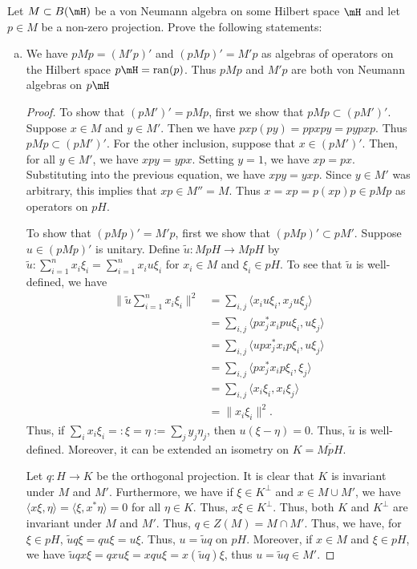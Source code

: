 \documentclass{article}
\begin{document}
 Let $M \subset B(\mH)$ be a von Neumann algebra on some Hilbert space $\mH$ and let $p \in M$ be a non-zero projection.  Prove the following statements:
\begin{enumerate}[(a)]
\item We have $pMp = (M' p)'$ and $(pMp)' = M'p$ as algebras of operators on the Hilbert space $p \mH = \ran(p)$.  Thus $pMp$ and $M'p$ are both von Neumann algebras on $p \mH$
  \begin{proof}
  To show that $(pM')' = pMp$, first we show that $pMp \subset (pM')'$. Suppose $x \in M$ and $y \in M'$.  Then we have $pxp(py) = ppxpy = pypxp$.  Thus $pMp \subset (pM')'$.  For the other inclusion, suppose that $x \in (pM')'$.  Then, for all $y \in M'$, we have $xpy = ypx$.  Setting $y = 1$, we have $xp = px$.  Substituting into the previous equation, we have $xpy = yxp$.  Since $y \in M'$ was arbitrary, this implies that $xp \in M'' = M$.  Thus $x = xp = p(xp)p \in pMp$ as operators on $pH$.

  To show that $(pMp)' = M'p$, first we show that $(pMp)' \subset pM'$.  Suppose $u \in (pMp)'$ is unitary. Define $\widetilde u : MpH \to MpH$ by
  $\widetilde u: \sum_{i=1}^n x_i \xi_i = \sum_{i=1}^n x_i u \xi_i$ for $x_i \in M$ and $\xi_i \in pH$.  To see that $\widetilde u$ is well-defined,
  we have
  \begin{align*}
    \| \widetilde u \sum_{i=1}^n x_i \xi_i \|^2 & = \sum_{i,j} \langle x_i u \xi_i, x_j u \xi_j \rangle \\
    & = \sum_{i,j} \langle p x_j^* x_i p u \xi_i,  u \xi_j \rangle \\
    & = \sum_{i,j} \langle u p x_j^* x_i p \xi_i,  u \xi_j \rangle \\
    & = \sum_{i,j} \langle  p x_j^* x_i p \xi_i,  \xi_j \rangle \\
    & = \sum_{i,j} \langle   x_i \xi_i,  x_i \xi_j \rangle \\
    & = \|x_i \xi_i\|^2.
  \end{align*}
  Thus, if $ \sum_i x_i \xi_i =: \xi = \eta := \sum_j y_j \eta_j$, then $u(\xi - \eta) = 0$.  Thus, $\widetilde u$ is well-defined.  Moreover, it can be extended an isometry on $K = \overline{MpH}$. 

  Let $q: H \to K$ be the orthogonal projection.  It is clear that $K$ is invariant under $M$ and $M'$.  Furthermore, we have if $\xi \in K^\perp$ and $x \in M \cup M'$, we have $\langle x \xi, \eta \rangle = \langle \xi, x^* \eta \rangle = 0$ for all $\eta \in K$.  Thus, $x \xi \in K^\perp$.  Thus, both $K$ and $K^\perp$ are invariant under $M$ and $M'$.  Thus, $q \in Z(M) = M \cap M'$. Thus, we have, for $\xi \in pH$,
  $\widetilde{u} q \xi = q u \xi = u \xi$.  Thus, $u = \widetilde{u} q$ on $pH$.  Moreover, if $x \in M$ and $\xi \in pH$, we have
  $\widetilde u q x \xi = q x u \xi = x q u \xi = x (\widetilde u q) \xi$, thus $u = \widetilde{u} q \in M'$.


\end{proof}
\end{enumerate}
\end{document}
